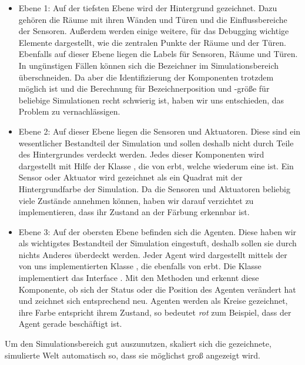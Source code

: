 \begin{itemize}
\item Ebene 1: Auf der tiefsten Ebene wird der Hintergrund gezeichnet. Dazu gehören die Räume mit ihren Wänden und Türen und die Einflussbereiche der Sensoren. Außerdem werden einige weitere, für das Debugging wichtige Elemente dargestellt, wie die zentralen Punkte der Räume und der Türen. Ebenfalls auf dieser Ebene liegen die Labels für Sensoren, Räume und Türen. In ungünstigen Fällen können sich die Bezeichner im Simulationsbereich überschneiden. Da aber die Identifizierung der Komponenten trotzdem möglich ist und die Berechnung für Bezeichnerposition und -größe für beliebige Simulationen recht schwierig ist, haben wir uns entschieden, das Problem zu vernachlässigen.

\item Ebene 2: Auf dieser Ebene liegen die Sensoren und Aktuatoren. Diese sind ein wesentlicher Bestandteil der Simulation und sollen deshalb nicht durch Teile des Hintergrundes verdeckt werden. Jedes dieser Komponenten wird dargestellt mit Hilfe der Klasse , die von  erbt, welche wiederum eine  ist. Ein Sensor oder Aktuator wird gezeichnet als ein Quadrat mit der Hintergrundfarbe der Simulation. Da die Sensoren und Aktuatoren beliebig viele Zustände annehmen können, haben wir darauf verzichtet zu implementieren, dass ihr Zustand an der Färbung erkennbar ist.

\item Ebene 3: Auf der obersten Ebene befinden sich die Agenten. Diese haben wir als wichtigstes Bestandteil der Simulation eingestuft, deshalb sollen sie durch nichts Anderes überdeckt werden. Jeder Agent wird dargestellt mittels der von uns implementierten Klasse , die ebenfalls von  erbt. Die Klasse  implementiert das Interface . Mit den Methoden  und  erkennt diese Komponente, ob sich der Status oder die Position des Agenten verändert hat und zeichnet sich entsprechend neu. Agenten werden als Kreise gezeichnet, ihre Farbe entspricht ihrem Zustand, so bedeutet \textit{rot} zum Beispiel, dass der Agent gerade beschäftigt ist.
\end{itemize} 

Um den Simulationsbereich gut auszunutzen, skaliert sich die gezeichnete, simulierte Welt automatisch so, dass sie möglichst groß angezeigt wird.

